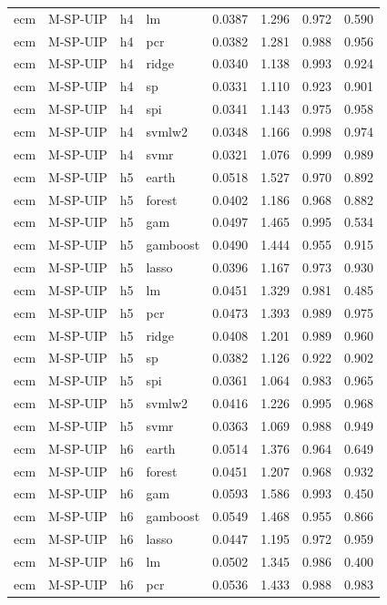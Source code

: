 \begin{ThreePartTable}
\begin{longtable}[t]{llclcccc}
ecm & M-SP-UIP & h4 & lm & 0.0387 & 1.296 & 0.972 & 0.590\\
ecm & M-SP-UIP & h4 & pcr & 0.0382 & 1.281 & 0.988 & 0.956\\
ecm & M-SP-UIP & h4 & ridge & 0.0340 & 1.138 & 0.993 & 0.924\\
ecm & M-SP-UIP & h4 & sp & 0.0331 & 1.110 & 0.923 & 0.901\\
ecm & M-SP-UIP & h4 & spi & 0.0341 & 1.143 & 0.975 & 0.958\\
ecm & M-SP-UIP & h4 & svmlw2 & 0.0348 & 1.166 & 0.998 & 0.974\\
ecm & M-SP-UIP & h4 & svmr & 0.0321 & 1.076 & 0.999 & 0.989\\
\addlinespace
ecm & M-SP-UIP & h5 & earth & 0.0518 & 1.527 & 0.970 & 0.892\\
ecm & M-SP-UIP & h5 & forest & 0.0402 & 1.186 & 0.968 & 0.882\\
ecm & M-SP-UIP & h5 & gam & 0.0497 & 1.465 & 0.995 & 0.534\\
ecm & M-SP-UIP & h5 & gamboost & 0.0490 & 1.444 & 0.955 & 0.915\\
ecm & M-SP-UIP & h5 & lasso & 0.0396 & 1.167 & 0.973 & 0.930\\
ecm & M-SP-UIP & h5 & lm & 0.0451 & 1.329 & 0.981 & 0.485\\
ecm & M-SP-UIP & h5 & pcr & 0.0473 & 1.393 & 0.989 & 0.975\\
ecm & M-SP-UIP & h5 & ridge & 0.0408 & 1.201 & 0.989 & 0.960\\
ecm & M-SP-UIP & h5 & sp & 0.0382 & 1.126 & 0.922 & 0.902\\
ecm & M-SP-UIP & h5 & spi & 0.0361 & 1.064 & 0.983 & 0.965\\
ecm & M-SP-UIP & h5 & svmlw2 & 0.0416 & 1.226 & 0.995 & 0.968\\
ecm & M-SP-UIP & h5 & svmr & 0.0363 & 1.069 & 0.988 & 0.949\\
\addlinespace
ecm & M-SP-UIP & h6 & earth & 0.0514 & 1.376 & 0.964 & 0.649\\
ecm & M-SP-UIP & h6 & forest & 0.0451 & 1.207 & 0.968 & 0.932\\
ecm & M-SP-UIP & h6 & gam & 0.0593 & 1.586 & 0.993 & 0.450\\
ecm & M-SP-UIP & h6 & gamboost & 0.0549 & 1.468 & 0.955 & 0.866\\
ecm & M-SP-UIP & h6 & lasso & 0.0447 & 1.195 & 0.972 & 0.959\\
ecm & M-SP-UIP & h6 & lm & 0.0502 & 1.345 & 0.986 & 0.400\\
ecm & M-SP-UIP & h6 & pcr & 0.0536 & 1.433 & 0.988 & 0.983\\

\end{longtable}
\end{ThreePartTable}
